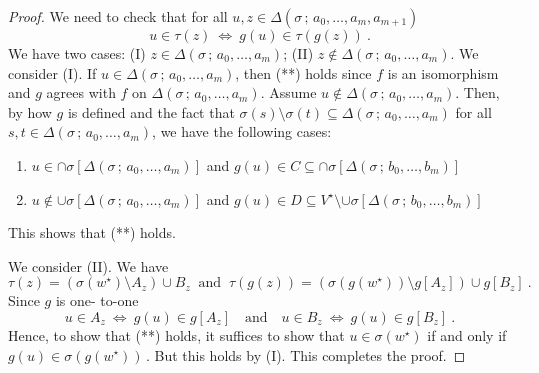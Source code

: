 \documentclass[10pt,a4paper, openany,  oldfontcommands]{memoir}
\newtheorem{open problem} [theorem] {Open Problem}
\begin{document}
\begin{proof}
We need to check that  for all  $  u,  z  \in   \Delta  \left(  \sigma  \,  ;  \,     a_0,  \ldots , a_m , a_{ m+1 }  \right)     $
\[
u  \in  \tau ( z )  
\    \Leftrightarrow    \   
g(u)  \in   \tau \left(  g(z)   \right)  
\       .     \tag{**}
\]
We have two cases: 
(I)  $  z  \in   \Delta  \left(  \sigma  \,  ;  \,     a_0,  \ldots , a_m   \right)     $; 
(II)  $  z    \not\in   \Delta  \left(  \sigma  \,  ;  \,     a_0,  \ldots , a_m   \right)     $.
We consider (I). 
If  $  u \in   \Delta  \left(  \sigma  \,  ;  \,     a_0,  \ldots , a_m   \right)   $, 
then (**) holds since  $f$  is an isomorphism and $g$  agrees with $f$  on  $   \Delta  \left(  \sigma  \,  ;  \,     a_0,  \ldots , a_m   \right)     $. 
Assume  $  u   \not\in   \Delta  \left(  \sigma  \,  ;  \,     a_0,  \ldots , a_m   \right)   $. 
Then, by how  $g$  is defined and the fact that  $  \sigma (s)  \setminus  \sigma (t)   \subseteq    \Delta  \left(  \sigma  \,  ;  \,     a_0,  \ldots , a_m   \right)   $  for all $  s, t  \in   \Delta  \left(  \sigma  \,  ;  \,     a_0,  \ldots , a_m   \right)    $, 
we have the following cases: 
\begin{enumerate}
\item  $  u  \in     \cap   \sigma   \left[  \Delta  \left(  \sigma  \,  ;  \,     a_0,  \ldots , a_m   \right)     \right]  $  
and  $  g(u)  \in  C    \subseteq    \cap   \sigma   \left[  \Delta  \left(  \sigma  \,  ;  \,     b_0,  \ldots , b_m   \right)     \right]  $  


\item     $  u   \not\in     \cup   \sigma   \left[  \Delta  \left(  \sigma  \,  ;  \,     a_0,  \ldots , a_m   \right)     \right]  $  
and  $  g(u)  \in  D    \subseteq  V^{  \star }  \setminus     \cup   \sigma   \left[  \Delta  \left(  \sigma  \,  ;  \,     b_0,  \ldots , b_m   \right)     \right]  $  
\end{enumerate}
This shows that (**) holds. 






We consider (II). We have 
\[
 \tau (z)  =     \left(    \sigma  \left(   w^{  \star }  \right)   \setminus  A_z  \right)   \cup   B_z     
 \     \mbox{  and   }     \   
 \tau  \left(   g(z) \right)   =   
 \left(    \sigma  \left(   g \left( w^{  \star }   \right)   \right)   \setminus   g  \left[ A_z   \right]  \right)   \cup    g  \left[ B_z   \right]  
 \       .
 \]
Since  $g$  is one- to-one
\[
u  \in A_z   \   \Leftrightarrow   \  g(u)  \in    g  \left[ A_z   \right] 
\      \       \      \mbox{  and   }      \        \        \  
u  \in B_z   \   \Leftrightarrow   \  g(u)  \in    g  \left[ B_z   \right] 
\      .
\]
Hence, to show that  (**) holds, it suffices to show that  
$  u  \in    \sigma  \left(   w^{  \star }  \right)    $  if and only if   $  g(u)  \in   \sigma  \left(   g \left( w^{  \star }   \right)    \right)    \,   $. 
But this holds by (I). 
This completes the proof. 
\end{proof}
\end{document}
